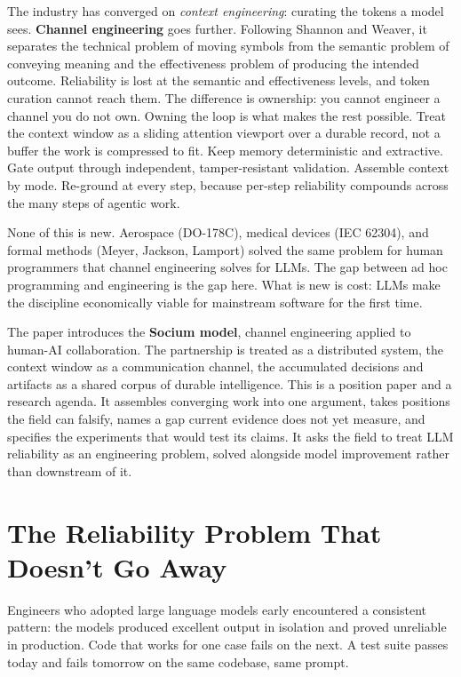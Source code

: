 \documentclass[11pt, a4paper]{article}
\begin{document}
The industry has converged on \emph{context engineering}: curating the tokens a model
sees. \textbf{Channel engineering} goes further. Following Shannon and Weaver, it
separates the technical problem of moving symbols from the semantic problem of conveying
meaning and the effectiveness problem of producing the intended outcome. Reliability is
lost at the semantic and effectiveness levels, and token curation cannot reach them. The
difference is ownership: you cannot engineer a channel you do not own. Owning the loop is
what makes the rest possible. Treat the context window as a sliding attention viewport
over a durable record, not a buffer the work is compressed to fit. Keep memory
deterministic and extractive. Gate output through independent, tamper-resistant
validation. Assemble context by mode. Re-ground at every step, because per-step
reliability compounds across the many steps of agentic work.

None of this is new. Aerospace (DO-178C), medical devices (IEC 62304), and formal methods
(Meyer, Jackson, Lamport) solved the same problem for human programmers that channel
engineering solves for LLMs. The gap between ad hoc programming and engineering is the gap
here. What is new is cost: LLMs make the discipline economically viable for mainstream
software for the first time.

The paper introduces the \textbf{Socium model}, channel engineering applied to human-AI
collaboration. The partnership is treated as a distributed system, the context window as a
communication channel, the accumulated decisions and artifacts as a shared corpus of
durable intelligence. This is a position paper and a research agenda. It assembles
converging work into one argument, takes positions the field can falsify, names a gap
current evidence does not yet measure, and specifies the experiments that would test its
claims. It asks the field to treat LLM reliability as an engineering problem, solved
alongside model improvement rather than downstream of it.

\section{The Reliability Problem That Doesn't Go Away}

Engineers who adopted large language models early encountered a consistent pattern: the
models produced excellent output in isolation and proved unreliable in production. Code
that works for one case fails on the next. A test suite passes today and fails tomorrow on
the same codebase, same prompt.
\end{document}
